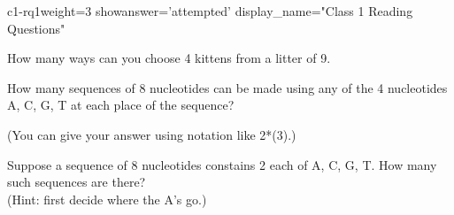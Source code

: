 

\newcommand{\RR}{{\mathbb R}}
\newcommand{\bs}[1]{\hbox{\boldmath$#1$}}
\DeclareRobustCommand{\transp}{^{\rm T}}
\newcommand{\lsub}[1]{{\hbox{\footnotesize$#1$}}}
\newcommand{\lexp}[1]{{\hbox{\footnotesize$#1$}}}
\newcommand{\blankpagemark}{\centerline{\sl This page intentionally blank.}}
\DeclareRobustCommand{\prm}{^{\hbox{\footnotesize$\,\prime$}}}
\DeclareRobustCommand{\pprm}{^{\hbox{\footnotesize$\,\prime\prime$}}}
\newenvironment{m}[1]{\left[\begin{array}{@{\,}#1@{\,}}}{\end{array}\right]}
\newcommand{\mat}[1]{\begin{bmatrix} #1 \end{bmatrix}}

\def\bs{\textbackslash{}}



\thispagestyle{empty}


\begin{edXproblem}{c1-rq1}{weight=3  showanswer='attempted' display_name="Class 1 Reading Questions"}


How many ways can you choose 4 kittens from a litter of 9.



How many sequences of 8 nucleotides can be made using any of the 4 nucleotides 
A, C, G, T at each place of the sequence?

(You can give your answer using notation like 2*(3).)


Suppose a sequence of 8 nucleotides constains 2 each of A, C, G, T.
How many such sequences are there?\\
(Hint: first decide where the A's go.)


\end{edXproblem}

